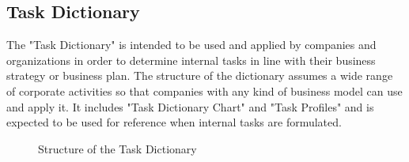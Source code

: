 \newpage
\subsection{Task Dictionary}
The "Task Dictionary" is intended to be used and applied by companies and organizations in order to
determine internal tasks in line with their business strategy or business plan. The structure of the dictionary
assumes a wide range of corporate activities so that companies with any kind of business model can use
and apply it.
It includes "Task Dictionary Chart" and "Task Profiles" and is expected to be used for reference when
internal tasks are formulated.

\begin{figure}[H]
    \centering
    \caption{ Structure of the Task Dictionary }
    \label{fig:task_Dictionary_Structure}
\end{figure}


